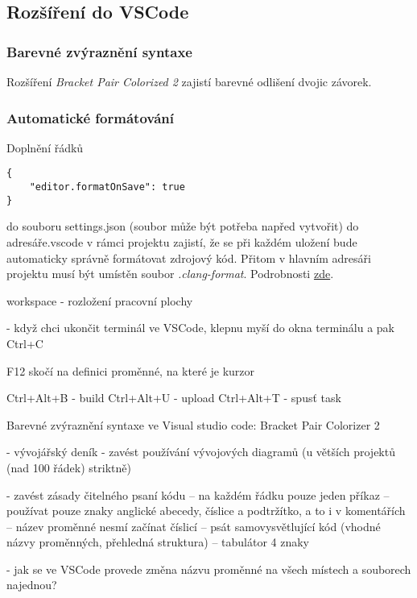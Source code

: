 
\subsection{Rozšíření do VSCode}

\subsubsection*{Barevné zvýraznění syntaxe}

Rozšíření \textit{Bracket Pair Colorized 2} zajistí barevné odlišení dvojic závorek.

\subsubsection*{Automatické formátování}

Doplnění řádků 
\begin{verbatim}
{
	"editor.formatOnSave": true
}
\end{verbatim}

do souboru settings.json (soubor může být potřeba napřed vytvořit) do adresáře.vscode v rámci projektu zajistí, že se při každém uložení bude automaticky správně formátovat zdrojový kód. 
Přitom v hlavním adresáři projektu musí být umístěn soubor \textit{.clang-format}.
Podrobnosti \href{https://github.com/RoboticsBrno/rb_clang_format}{zde}.

workspace - rozložení pracovní plochy

- když chci ukončit terminál ve VSCode, klepnu myší do okna terminálu a pak Ctrl+C

F12 skočí na definici proměnné, na které je kurzor  

Ctrl+Alt+B - build 
Ctrl+Alt+U - upload
Ctrl+Alt+T - spusť task 


Barevné zvýraznění syntaxe ve Visual studio code: 
Bracket Pair Colorizer 2

- vývojářský deník 
- zavést používání vývojových diagramů (u větších projektů (nad 100 řádek) striktně) 

- zavést zásady čitelného psaní kódu 
-- na každém řádku pouze jeden příkaz 
-- používat pouze znaky anglické abecedy, číslice a podtržítko, a to i v komentářích 
-- název proměnné nesmí začínat číslicí 
-- psát samovysvětlující kód (vhodné názvy proměnných, přehledná struktura) 
-- tabulátor 4 znaky 

- jak se ve VSCode provede změna názvu proměnné na všech místech a souborech najednou? 

